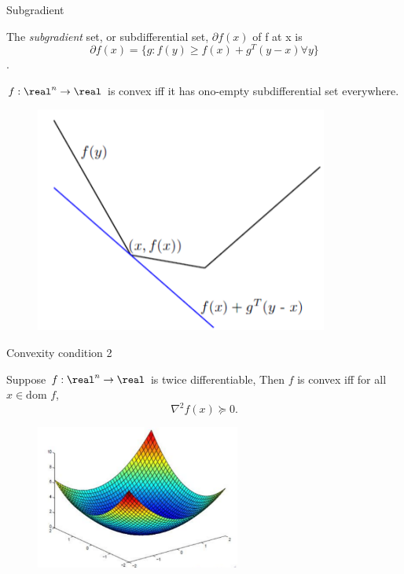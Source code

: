 \documentclass[notes]{beamer}
\begin{document}
\begin{frame}{Subgradient}
	\begin{define}
		The \textit{subgradient} set, or subdifferential set, $\partial f(x)$ of f at x is $$\partial f(x) = \{ g: f(y) \ge f(x) +g^T(y-x) \forall y\}$$. 
	\end{define}
	
	\begin{minipage}{\textwidth}
		\begin{minipage}{.47\textwidth}
			\begin{thm}
				$f:\real^n\rightarrow \real$ is convex iff it has ono-empty subdifferential set everywhere. 
			\end{thm}
		\end{minipage}
		\hfill
		\begin{minipage}{.47\textwidth}
			\begin{figure}
				\includegraphics[width=\textwidth]{2018-03-04-22-37-40.png} 
			\end{figure}
		\end{minipage}
	\end{minipage}
\end{frame} 
\begin{frame}{Convexity condition 2} 
	\begin{thm}
		Suppose $f: \real^{n} \rightarrow \real $ is twice differentiable, Then $f$ is convex iff for all $x \in \text{dom } f $, \[\nabla^2f(x) \succeq 0. \]
	\end{thm}
	\begin{figure}
	\includegraphics[width=0.6\textwidth]{2018-03-05-10-37-24.png} 
	\end{figure}
\end{frame}
\end{document}
